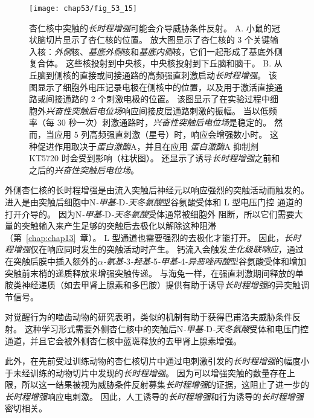\begin{figure}[htbp]
	\centering
	\texttt{[image: chap53/fig\_53\_15]}
	\caption{杏仁核中突触的\textit{长时程增强}可能会介导威胁条件反射。
		A. 小鼠的冠状脑切片显示了杏仁核的位置。
		放大图显示了杏仁核的 3 个关键输入核：\textit{外侧}核、\textit{基底外侧}核和\textit{基底内侧}核，它们一起形成了基底外侧复合体。
		这些核投射到中央核，中央核投射到下丘脑和脑干\cite{maren1999long}。
		B. 从丘脑到侧核的直接或间接通路的高频强直刺激启动\textit{长时程增强}。
		该图显示了细胞外电压记录电极在侧核中的位置，以及用于激活直接通路或间接通路的 2 个刺激电极的位置。
		该图显示了在实验过程中细胞外\textit{兴奋性突触后电位场}响应间接皮层通路刺激的振幅。
		当以低频率（每 30 秒一次）刺激通路时，\textit{兴奋性突触后电位场}是稳定的。
		然而，当应用 5 列高频强直刺激（星号）时，响应会增强数小时。
		这种促进作用取决于\textit{蛋白激酶}A，并且在应用 \textit{蛋白激酶}A 抑制剂 KT5720 时会受到影响（柱状图）。
		还显示了诱导\textit{长时程增强}之前和之后的\textit{兴奋性突触后电位场}\cite{huang1998postsynaptic,huang2000both}。}
	\label{fig:53_15}
\end{figure}


外侧杏仁核的长时程增强是由流入突触后神经元以响应强烈的突触活动而触发的。
进入是由突触后细胞中N\textit{-甲基-}D\textit{-天冬氨酸}型谷氨酸受体和 L 型电压门控  通道的打开介导的。
因为N\textit{-甲基-}D\textit{-天冬氨酸}受体通常被细胞外  阻断，所以它们需要大量的突触输入来产生足够的突触后去极化以解除这种阻滞（第~\ref{chap:chap13}~章）。
L 型通道也需要强烈的去极化才能打开。
因此，\textit{长时程增强}仅在响应同时发生的突触活动时产生。
钙流入会触发\textit{生化级联响应}，通过在突触后膜中插入额外的\textit{$\alpha$-氨基-}3\textit{-羟基-}5\textit{-甲基-}4\textit{-异恶唑丙酸}型谷氨酸受体和增加突触前末梢的递质释放来增强突触传递。
与海兔一样，在强直刺激期间释放的单胺类神经递质（如去甲肾上腺素和多巴胺）提供有助于诱导\textit{长时程增强}的异突触调节信号。


对觉醒行为的啮齿动物的研究表明，类似的机制有助于获得巴甫洛夫威胁条件反射。
这种学习形式需要外侧杏仁核中的突触后N\textit{-甲基-}D\textit{-天冬氨酸}受体和电压门控通道，并且它会被外侧杏仁核中蓝斑释放的去甲肾上腺素增强。


此外，在先前受过训练动物的杏仁核切片中通过电刺激引发的\textit{长时程增强}的幅度小于未经训练的动物切片中发现的\textit{长时程增强}。
因为可以增强突触的数量存在上限，所以这一结果被视为威胁条件反射募集\textit{长时程增强}的证据，这阻止了进一步的\textit{长时程增强}响应电刺激。
因此，人工诱导的\textit{长时程增强}和行为诱导的\textit{长时程增强}密切相关。


